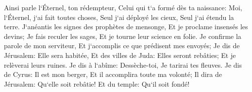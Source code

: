 \verse Ainsi parle l`Éternel, ton rédempteur, Celui qui t`a formé dès ta naissance: Moi, l`Éternel, j`ai fait toutes choses, Seul j`ai déployé les cieux, Seul j`ai étendu la terre. 
\verse J`anéantis les signes des prophètes de mensonge, Et je proclame insensés les devins; Je fais reculer les sages, Et je tourne leur science en folie. 
\verse Je confirme la parole de mon serviteur, Et j`accomplis ce que prédisent mes envoyés; Je dis de Jérusalem: Elle sera habitée, Et des villes de Juda: Elles seront rebâties; Et je relèverai leurs ruines. 
\verse Je dis à l`abîme: Dessèche-toi, Je tarirai tes fleuves. 
\verse Je dis de Cyrus: Il est mon berger, Et il accomplira toute ma volonté; Il dira de Jérusalem: Qu`elle soit rebâtie! Et du temple: Qu`il soit fondé! 

